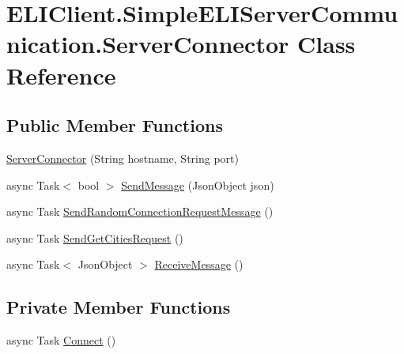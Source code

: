 \hypertarget{class_e_l_i_client_1_1_simple_e_l_i_server_communication_1_1_server_connector}{}\section{E\+L\+I\+Client.\+Simple\+E\+L\+I\+Server\+Communication.\+Server\+Connector Class Reference}
\label{class_e_l_i_client_1_1_simple_e_l_i_server_communication_1_1_server_connector}
\subsection*{Public Member Functions}
\begin{DoxyCompactItemize}
\item 
\hyperlink{class_e_l_i_client_1_1_simple_e_l_i_server_communication_1_1_server_connector_ad9a29fa265ea9a860f92ed58c11858e6}{Server\+Connector} (String hostname, String port)
\item 
async Task$<$ bool $>$ \hyperlink{class_e_l_i_client_1_1_simple_e_l_i_server_communication_1_1_server_connector_a6c02f184947bf664847cefe578225cf5}{Send\+Message} (Json\+Object json)
\item 
async Task \hyperlink{class_e_l_i_client_1_1_simple_e_l_i_server_communication_1_1_server_connector_a51b31eed1d4faf571cc0aa512dc675c1}{Send\+Random\+Connection\+Request\+Message} ()
\item 
async Task \hyperlink{class_e_l_i_client_1_1_simple_e_l_i_server_communication_1_1_server_connector_a524197983d52fb96d7e9105c3730011a}{Send\+Get\+Cities\+Request} ()
\item 
async Task$<$ Json\+Object $>$ \hyperlink{class_e_l_i_client_1_1_simple_e_l_i_server_communication_1_1_server_connector_af805dc6dc3d37342b2ae263cf02740e3}{Receive\+Message} ()
\end{DoxyCompactItemize}
\subsection*{Private Member Functions}
\begin{DoxyCompactItemize}
\item 
async Task \hyperlink{class_e_l_i_client_1_1_simple_e_l_i_server_communication_1_1_server_connector_a71309c0a8d78df03c57c74b7da8b360a}{Connect} ()
\end{DoxyCompactItemize}
